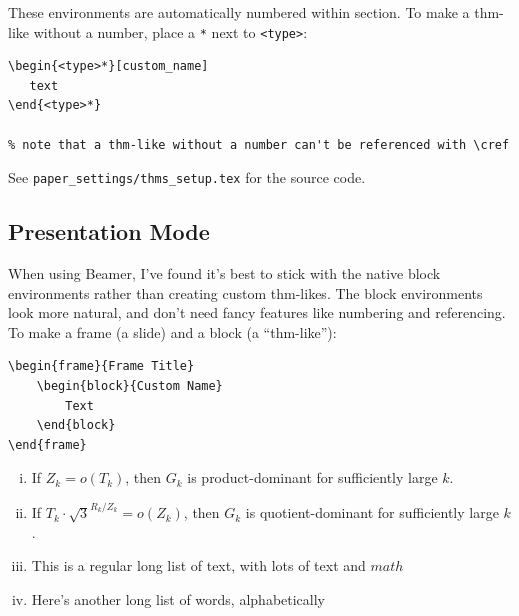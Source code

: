 \documentclass[10pt]{article}
\newcommand\paren[1]{\left ( #1 \right ) }
\begin{document}
These environments are automatically numbered within section. To make a thm-like without a number, place a \verb|*| next to \verb|<type>|:

\begin{lstlisting}[language={[LaTeX]TeX}]
\begin{<type>*}[custom_name]
   text
\end{<type>*}

% note that a thm-like without a number can't be referenced with \cref
\end{lstlisting}

See \verb|paper_settings/thms_setup.tex| for the source code.

\subsection{Presentation Mode}

When using Beamer, I've found it's best to stick with the native block environments rather than creating custom thm-likes. The block environments look more natural, and don't need fancy features like numbering and referencing. To make a frame (a slide) and a block (a ``thm-like''):

\begin{lstlisting}[language={[LaTeX]TeX}]
\begin{frame}{Frame Title}
    \begin{block}{Custom Name}
        Text
    \end{block}
\end{frame}
\end{lstlisting}

\begin{enumerate}[(i)]
\item If $Z_k = o(T_k)$, then $G_k$ is product-dominant for sufficiently large $k$.
        \item If $T_k\cdot \sqrt 3^{R_k/Z_k} = o\paren{Z_k}$, then $G_k$ is quotient-dominant for sufficiently large $k$.
        \item This is a regular long list of text, with lots of text and $math$
        \item Here's another long list of words, alphabetically
\end{enumerate}
\end{document}
